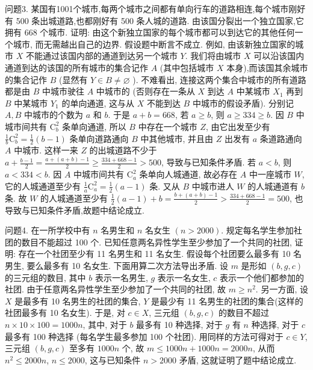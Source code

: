 问题3. 某国有1001个城市,每两个城市之间都有单向行车的道路相连,每个城市刚好有 500 条出城道路,也都刚好有 500 条人城的道路.
由该国分裂出一个独立国家,它拥有 668 个城市.
证明: 由这个新独立国家的每个城市都可以到达它的其他任何一个城市, 而无需越出自己的边界.
假设题中断言不成立.
例如, 由该新独立国家的城市 $X$ 不能通过该国内部的通道到达另一个城市 $Y$. 我们将由城市 $X$ 可以沿该国内通道到达的该国的所有城市的集合记作 $A$ (其中包括城市 $X$ 本身),而该国其余城市的集合记作 $B$ (显然有 $Y \in B \neq \varnothing$ ). 不难看出, 连接这两个集合中城市的所有道路都是由 $B$ 中城市驶往 $A$ 中城市的 (否则存在一条从 $X$ 到达 $A$ 中某城市 $X_1$ 再到 $B$ 中某城市 $Y_1$ 的单向通道, 这与从 $X$ 不能到达 $B$ 中城市的假设矛盾). 分别记 $A, B$ 中城市的个数为 $a$ 和 $b$. 于是 $a+b=668$, 若 $a \geqslant b$, 则 $a \geqslant 334 \geqslant b$. 因 $B$ 中城市间共有 $\mathrm{C}_b^2$ 条单向通道, 所以 $B$ 中存在一个城市 $Z$, 由它出发至少有 $\frac{1}{b} \mathrm{C}_b^2=\frac{1}{2}(b-1)$ 条单向道路通向 $B$ 中其他城市, 并且由 $Z$ 出发有 $a$ 条道路通向 $A$ 中城市.
这样一来 $Z$ 的出城道路不少于 $a+\frac{b-1}{2}= \frac{a+(a+b)-1}{2} \geqslant \frac{334+668-1}{2}>500$, 导致与已知条件矛盾.
若 $a<b$, 则 $a<334<b$. 因 $A$ 中城市间共有 $\mathrm{C}_a^2$ 条单向人城通道, 故必存在 $A$ 中一座城市 $W$, 它的人城通道至少有 $\frac{1}{a} \mathrm{C}_a^2=\frac{1}{2}(a-1)$ 条.
又从 $B$ 中城市进人 $W$ 的人城通道有 $b$ 条.
故 $W$ 的人城通道至少有 $\frac{1}{2}(a-1)+b=\frac{b+(a+b)-1}{2}> \frac{334+668-1}{2}=500$, 也导致与已知条件矛盾,故题中结论成立.



问题4. 在一所学校中有 $n$ 名男生和 $n$ 名女生 $(n>2000)$. 规定每名学生参加社团的数目不能超过 100 个.
已知任意两名异性学生至少参加了一个共同的社团, 证明: 存在一个社团至少有 11 名男生和 11 名女生.
假设每个社团要么最多有 10 名男生, 要么最多有 10 名女生.
下面用算二次方法导出矛盾.
设 $m$ 是形如 $(b, g, c)$ 的三元组的数目, 其中 $b$ 表示一名男生, $g$ 表示一名女生, $c$ 表示一个他们都参加的社团.
由于任意两名异性学生至少参加了一个共同的社团, 故 $m \geqslant n^2$. 另一方面, 设 $X$ 是最多有 10 名男生的社团的集合, $Y$ 是最少有 11 名男生的社团的集合(这样的社团最多有 10 名女生). 于是, 对 $c \in X$, 三元组 $(b, g, c)$ 的数目不超过 $n \times 10 \times 100= 1000 n$, 其中, 对于 $b$ 最多有 10 种选择, 对于 $g$ 有 $n$ 种选择, 对于 $c$ 最多有 100 种选择 (每名学生最多参加 100 个社团). 用同样的方法可得对于 $c \in Y$, 三元组 $(b, g, c)$ 至多有 $1000 n$ 个, 故 $m \leqslant 1000 n+1000 n=2000 n$, 从而 $n^2 \leqslant 2000 n$, $n \leqslant 2000$, 这与已知条件 $n>2000$ 矛盾, 这就证明了题中结论成立.



